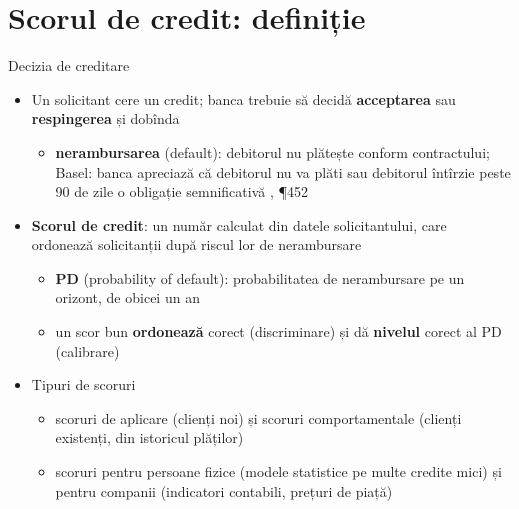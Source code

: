\section{Scorul de credit: definiție}

\begin{frame}{Decizia de creditare}
\itemsize{\small}
\begin{itemize}
    \item Un solicitant cere un credit; banca trebuie să decidă \textbf{acceptarea} sau \textbf{respingerea} și dobînda
    \begin{itemize}
        \item \textbf{nerambursarea} (default): debitorul nu plătește conform contractului; Basel: banca apreciază că debitorul nu va plăti sau debitorul întîrzie peste 90 de zile o obligație semnificativă , ¶452
    \end{itemize}
    \item \textbf{Scorul de credit}: un număr calculat din datele solicitantului, care ordonează solicitanții după riscul lor de nerambursare
    \begin{itemize}
        \item \textbf{PD} (probability of default): probabilitatea de nerambursare pe un orizont, de obicei un an
        \item un scor bun \textbf{ordonează} corect (discriminare) și dă \textbf{nivelul} corect al PD (calibrare)
    \end{itemize}
    \item Tipuri de scoruri
    \begin{itemize}
        \item scoruri de aplicare (clienți noi) și scoruri comportamentale (clienți existenți, din istoricul plăților)
        \item scoruri pentru persoane fizice (modele statistice pe multe credite mici) și pentru companii (indicatori contabili, prețuri de piață)
    \end{itemize}
\end{itemize}
\end{frame}

